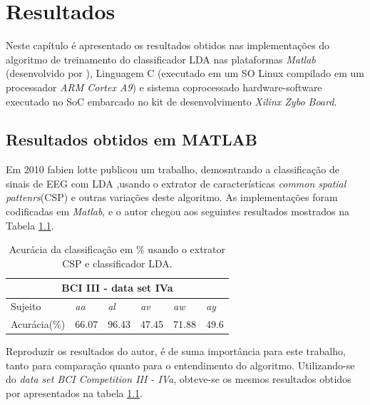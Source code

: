 \chapter[Resultados e Dicussão ]{Resultados}

Neste capítulo é apresentado os resultados obtidos nas implementações do algoritmo de treinamento do classificador LDA nas plataformas \textit{Matlab} (desenvolvido por \cite{F.Lotte}), Linguagem C (executado em um SO Linux compilado em um processador \textit{ARM Cortex A9}) e sistema coprocessado hardware-software executado no SoC embarcado no kit de desenvolvimento \textit{Xilinx Zybo Board}.

\section{Resultados obtidos em MATLAB}
Em 2010 fabien lotte publicou um trabalho, demosntrando a classificação de sinais de EEG com LDA \cite{F.Lotte},usando o extrator de características \textit{common spatial pattenrs}(CSP) e outras
variações deste algoritmo. 
As implementações foram codificadas em \textit{Matlab}, e o autor chegou aos seguintes resultados mostrados na Tabela \ref{resultlotte}.

\begin{table}[h]
\centering
\caption{Acurácia da classificação em \% usando o extrator CSP e classificador LDA.}
\label{resultlotte}
\begin{tabular}{|l|l|l|l|l|l|}
\hline
\multicolumn{6}{|c|}{BCI III -  data set IVa}  \\ \hline
Sujeito & \textit{aa}    & \textit{al}    & \textit{av}    & \textit{aw}    & \textit{ay}   \\ \hline
Acurácia(\%)     & 66.07 & 96.43 & 47.45 & 71.88 & 49.6 \\ \hline
\end{tabular}
\end{table}
 
Reproduzir os resultados do autor, é de suma importância para este trabalho, tanto para comparação quanto para o entendimento do algoritmo. Utilizando-se do \textit{data set BCI Competition III - IVa}, obteve-se os mesmos resultados obtidos por \cite{F.Lotte} apresentados na tabela \ref{resultlotte}.

